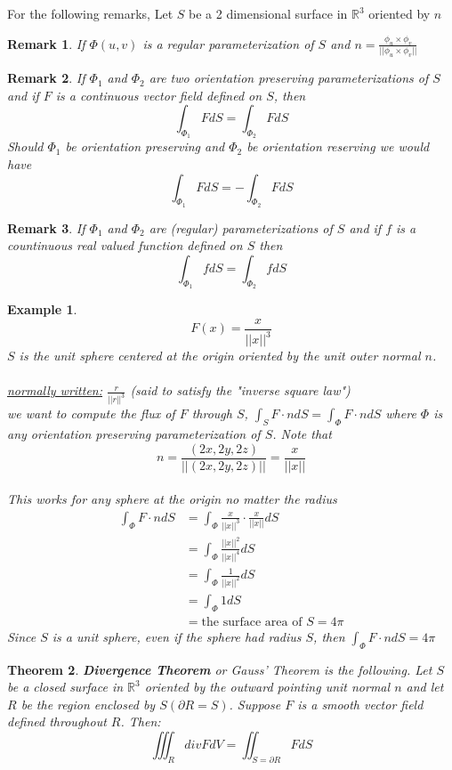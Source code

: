 \documentclass[12pt]{article}
\theoremstyle{plain}
\newtheorem*{remark}{Remark}
\newtheorem{theorem}{Theorem}[section]
\newtheorem{example}[theorem]{Example}
\theoremstyle{definition}
\begin{document}
For the following remarks, Let $S$ be a 2 dimensional surface in $\mathbb{R}^3$ oriented by $n$
\begin{remark}
	If $\Phi (u,v)$ is a regular parameterization of $S$ and $n = \frac{\phi_u \times \phi_v}{||\phi_u \times \phi_v||}$
\end{remark}
\begin{remark}
	If $\Phi_1$ and $\Phi_2$ are two orientation preserving parameterizations of $S$ and if $F$ is a continuous vector field defined on $S$, then
	$$\int_{\Phi_1} F dS = \int_{\Phi_2} F dS$$
	Should $\Phi_1$ be orientation preserving and $\Phi_2$ be orientation reserving we would have
	$$\int_{\Phi_1} F dS = -\int_{\Phi_2} F dS$$
\end{remark}
\begin{remark}
	If $\Phi_1$ and $\Phi_2$ are (regular) parameterizations of $S$ and if $f$ is a countinuous real valued function defined on $S$ then
	$$\int_{\Phi_1} f dS = \int_{\Phi_2} f dS$$
\end{remark}

\begin{example}
	$$F(x) = \frac{x}{||x||^3}$$
	$S$ is the unit sphere centered at the origin oriented by the unit outer normal $n$.\\
	\\
	\underline{normally written:} $\frac{r}{||r||^3}$ (said to satisfy the "inverse square law")\\
	we want to compute the flux of $F$ through $S$, $\int_S F \cdot n dS = \int_\Phi F \cdot n dS$ where $\Phi$ is any orientation preserving parameterization of $S$. Note that $$n = \frac{(2x,2y,2z)}{||(2x,2y,2z)||} = \frac{x}{||x||}$$\\
	This works for any sphere at the origin no matter the radius\\
	\begin{align*}
		\int_\Phi F \cdot n dS &= \int_\Phi \frac{x}{||x||^3}\cdot \frac{x}{||x||} dS\\
		&= \int_\Phi \frac{||x||^2}{||x||^4} dS\\
		&= \int_\Phi \frac{1}{||x||^2} dS\\
		&= \int_\Phi 1 dS\\
		&= \text{the surface area of $S$} = 4\pi
	\end{align*}
	Since $S$ is a unit sphere, even if the sphere had radius $S$, then $\int_\Phi F \cdot n dS = 4\pi$
\end{example}

\begin{theorem}
	\textbf{Divergence Theorem} or Gauss' Theorem is the following. Let $S$ be a closed surface in $\mathbb{R}^3$ oriented by the outward pointing unit normal $n$ and let $R$ be the region enclosed by $S (\partial R = S)$. Suppose $F$ is a smooth vector field defined throughout $R$. Then:
	$$\iiint_R div F dV = \iint_{S=\partial R} F dS$$
\end{theorem}
\end{document}
